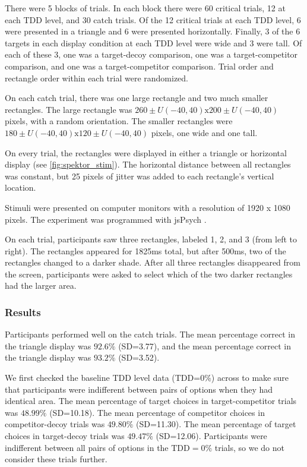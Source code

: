 \documentclass{umassthesis}          %
\begin{document}
There were 5 blocks of trials. In each block there were 60 critical trials, 12 at each TDD level, and 30 catch trials. Of the 12 critical trials at each TDD level, 6 were presented in a triangle and 6 were presented horizontally. Finally, 3 of the 6 targets in each display condition at each TDD level were wide and 3 were tall. Of each of these 3, one was a target-decoy comparison, one was a target-competitor comparison, and one was a target-competitor comparison. Trial order and rectangle order within each trial were randomized.

On each catch trial, there was one large rectangle and two much smaller rectangles. The large rectangle was $260 \pm U(-40, 40) \text{x} 200 \pm U(-40, 40)$ pixels, with a random orientation. The smaller rectangles were $180 \pm U(-40, 40) \text{x} 120 \pm U(-40, 40)$ pixels, one wide and one tall.

On every trial, the rectangles were displayed in either a triangle or horizontal display (see \ref{fig:spektor_stim}). The horizontal distance between all rectangles was constant, but 25 pixels of jitter was added to each rectangle's vertical location.

Stimuli were presented on computer monitors with a resolution of 1920 x 1080 pixels. The experiment was programmed with jsPsych \parencite{deleeuwJsPsychJavaScriptLibrary2015}. 

On each trial, participants saw three rectangles, labeled 1, 2, and 3 (from left to right). The rectangles appeared for 1825ms total, but after 500ms, two of the rectangles changed to a darker shade. After all three rectangles disappeared from the screen, participants were asked to select which of the two darker rectangles had the larger area.

\subsubsection{Results}

Participants performed well on the catch trials. The mean percentage correct in the triangle display was $92.6\%$ (SD=3.77), and the mean percentage correct in the triangle display was $93.2\%$ (SD=3.52). 

We first checked the baseline TDD level data (TDD=$0\%$) across to make sure that participants were indifferent between pairs of options when they had identical area. The mean percentage of target choices in target-competitor trials was $48.99\%$ (SD=10.18). The mean percentage of competitor choices in competitor-decoy trials was $49.80\%$ (SD=11.30). The mean percentage of target choices in target-decoy trials was $49.47\%$ (SD=12.06). Participants were indifferent between all pairs of options in the $\text{TDD}=0\%$ trials, so we do not consider these trials further.
\end{document}
